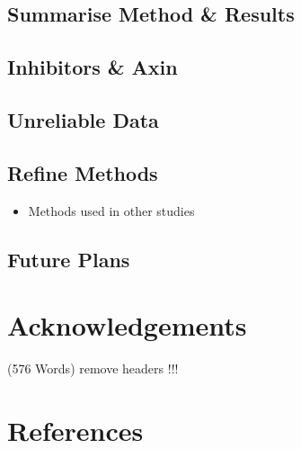\documentclass[
  12pt,
]{article}
\providecommand{\tightlist}{%
  \setlength{\itemsep}{0pt}\setlength{\parskip}{0pt}}
\begin{document}
\hypertarget{summarise-method-results}{%
\subsection{Summarise Method \& Results}\label{summarise-method-results}}

\hypertarget{inhibitors-axin}{%
\subsection{Inhibitors \& Axin}\label{inhibitors-axin}}

\hypertarget{unreliable-data}{%
\subsection{Unreliable Data}\label{unreliable-data}}

\hypertarget{refine-methods}{%
\subsection{Refine Methods}\label{refine-methods}}

\begin{itemize}
\tightlist
\item
  Methods used in other studies
\end{itemize}

\hypertarget{future-plans}{%
\subsection{Future Plans}\label{future-plans}}

\hypertarget{acknowledgements}{%
\section{Acknowledgements}\label{acknowledgements}}

\begin{flushright}
(576 Words) remove headers !!!
\end{flushright}

\hypertarget{references}{%
\section{References}\label{references}}
\end{document}

